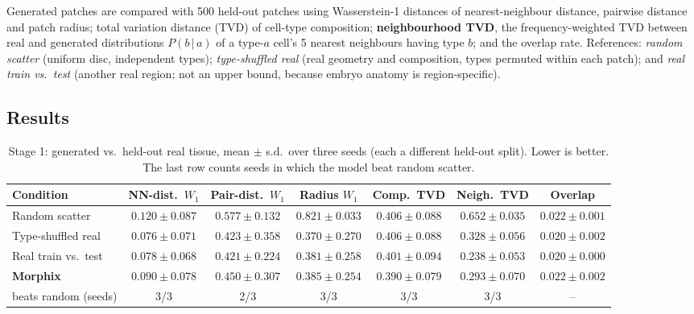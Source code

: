 \documentclass[journal]{IEEEtran}
\begin{document}
Generated patches are compared with 500 held-out patches using Wasserstein-1 distances of nearest-neighbour distance, pairwise distance and patch radius; total variation distance (TVD) of cell-type composition; \textbf{neighbourhood TVD}, the frequency-weighted TVD between real and generated distributions $P(b\,|\,a)$ of a type-$a$ cell's 5 nearest neighbours having type $b$; and the overlap rate. References: \emph{random scatter} (uniform disc, independent types); \emph{type-shuffled real} (real geometry and composition, types permuted within each patch); and \emph{real train vs.\ test} (another real region; not an upper bound, because embryo anatomy is region-specific).

\subsection{Results}

\begin{table}[!t]
\centering
\caption{Stage 1: generated vs.\ held-out real tissue, mean $\pm$ s.d.\ over three seeds (each a different held-out split). Lower is better. The last row counts seeds in which the model beat random scatter.}
\label{tab:s1}
\small
\begin{tabular}{lcccccc}
\toprule
Condition & NN-dist.\ $W_1$ & Pair-dist.\ $W_1$ & Radius $W_1$ & Comp.\ TVD & Neigh.\ TVD & Overlap \\
\midrule
Random scatter          & $0.120 \pm 0.087$ & $0.577 \pm 0.132$ & $0.821 \pm 0.033$ & $0.406 \pm 0.088$ & $0.652 \pm 0.035$ & $0.022 \pm 0.001$ \\
Type-shuffled real      & $0.076 \pm 0.071$ & $0.423 \pm 0.358$ & $0.370 \pm 0.270$ & $0.406 \pm 0.088$ & $0.328 \pm 0.056$ & $0.020 \pm 0.002$ \\
Real train vs.\ test    & $0.078 \pm 0.068$ & $0.421 \pm 0.224$ & $0.381 \pm 0.258$ & $0.401 \pm 0.094$ & $0.238 \pm 0.053$ & $0.020 \pm 0.000$ \\
\midrule
\textbf{Morphix} & $0.090 \pm 0.078$ & $0.450 \pm 0.307$ & $0.385 \pm 0.254$ & $0.390 \pm 0.079$ & $\mathbf{0.293 \pm 0.070}$ & $0.022 \pm 0.002$ \\
\quad beats random (seeds) & 3/3 & 2/3 & 3/3 & 3/3 & 3/3 & -- \\
\bottomrule
\end{tabular}
\end{table}
\end{document}
